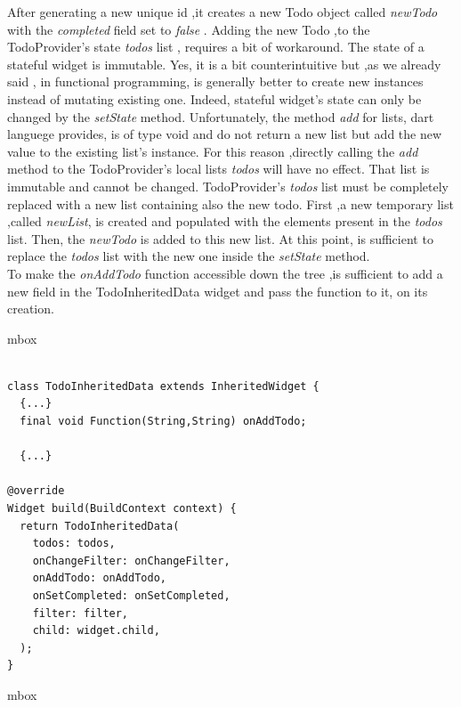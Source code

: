 After generating a new unique id ,it creates a new Todo object called \textit{newTodo }with the \textit{completed }field set to \textit{false }. Adding the new Todo ,to the TodoProvider’s state \textit{todos }list , requires a bit of workaround. The state of a stateful widget is immutable. Yes, it is a bit counterintuitive but ,as we already said , in functional programming, is generally better to create new instances instead of mutating existing one. Indeed, stateful widget's state can only be changed by the \textit{setState } method. Unfortunately, the method \textit{add} for lists, dart languege provides, is of type void and do not return a new list but add the new value to the existing list's instance. For this reason ,directly calling the \textit{add} method to the TodoProvider’s local lists \textit{todos }will have no effect. That list is immutable and cannot be changed.
TodoProvider’s \textit{todos }list must be completely replaced with a new list containing also the new todo. First ,a new temporary list ,called \textit{newList}, is created and populated with the elements present in the \textit{todos }list. Then, the \textit{newTodo }is added to this new list. At this point, is sufficient to replace the \textit{todos }list with the new one inside the \textit{setState} method.\\
To make the \textit{onAddTodo} function accessible down the tree ,is sufficient to add a new field in the TodoInheritedData widget and pass the function to it, on its creation.
\mbox{}\\

\begin{code}

mbox{}\\

\begin{verbatim}

class TodoInheritedData extends InheritedWidget {
  {...}
  final void Function(String,String) onAddTodo;

  {...}

@override
Widget build(BuildContext context) {
  return TodoInheritedData(
    todos: todos,
    onChangeFilter: onChangeFilter,
    onAddTodo: onAddTodo,
    onSetCompleted: onSetCompleted,
    filter: filter,
    child: widget.child,
  );
}
\end{verbatim}
\end{code}
mbox{}\\

